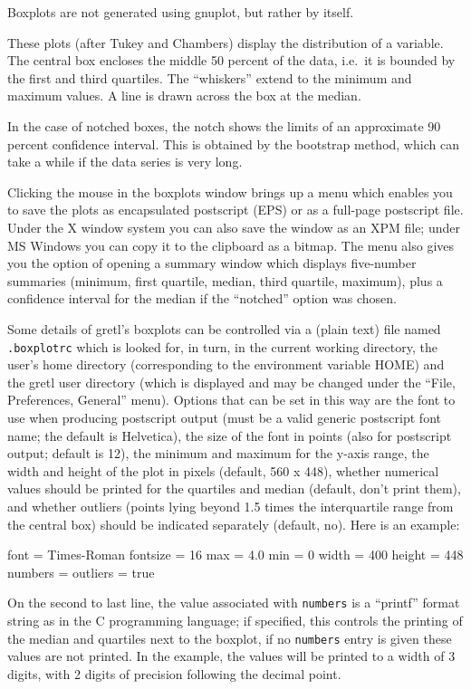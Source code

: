 Boxplots are not generated using gnuplot, but rather by 
itself.

These plots (after Tukey and Chambers) display the distribution
of a variable. The central box encloses the middle 50 percent of the
data, i.e.\ it is bounded by the first and third quartiles.  The
``whiskers'' extend to the minimum and maximum values.  A line is
drawn across the box at the median.

In the case of notched boxes, the notch shows the limits of an
approximate 90 percent confidence interval.  This is obtained by the
bootstrap method, which can take a while if the data series is very
long.

Clicking the mouse in the boxplots window brings up a menu which
enables you to save the plots as encapsulated postscript (EPS) or as a
full-page postscript file.  Under the X window system you can also
save the window as an XPM file; under MS Windows you can copy it to
the clipboard as a bitmap.  The menu also gives you the option of
opening a summary window which displays five-number summaries
(minimum, first quartile, median, third quartile, maximum), plus a
confidence interval for the median if the ``notched'' option was
chosen.  

Some details of gretl's boxplots can be controlled via a (plain text)
file named \verb+.boxplotrc+ which is looked for, in turn, in the
current working directory, the user's home directory (corresponding to
the environment variable HOME) and the gretl user directory (which is
displayed and may be changed under the ``File, Preferences, General''
menu).  Options that can be set in this way are the font to use when
producing postscript output (must be a valid generic postscript font
name; the default is Helvetica), the size of the font in points (also
for postscript output; default is 12), the minimum and maximum for the
y-axis range, the width and height of the plot in pixels (default, 560
x 448), whether numerical values should be printed for the quartiles
and median (default, don't print them), and whether outliers (points
lying beyond 1.5 times the interquartile range from the central box)
should be indicated separately (default, no).  Here is an example:

\begin{code}
    font = Times-Roman
    fontsize = 16
    max = 4.0
    min = 0
    width = 400
    height = 448
    numbers = %
    outliers = true
\end{code}

On the second to last line, the value associated with \verb+numbers+
is a ``printf'' format string as in the C programming language; if
specified, this controls the printing of the median and quartiles next
to the boxplot, if no \verb+numbers+ entry is given these values are
not printed.  In the example, the values will be printed to a width of
3 digits, with 2 digits of precision following the decimal point.

